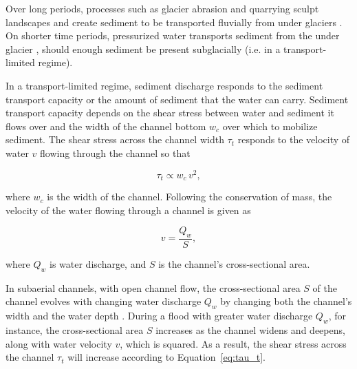 \documentclass[11pt]{article}
\begin{document}
Over long periods, processes such as glacier abrasion and quarrying sculpt landscapes and create sediment to be transported fluvially from under glaciers \citep[c.f.][]{hallet1979,iverson2012,ugelvig2018}. 
On shorter time periods, pressurized water transports sediment from the under glacier \citep{walder1994,creyts2013,beaud2018}, should enough sediment be present subglacially (i.e. in a transport-limited regime).

In a transport-limited regime, sediment discharge responds to the sediment transport capacity or the amount of sediment that the water can carry.
Sediment transport capacity depends on the shear stress between water and sediment it flows  over \citep{shields1936,meyer1948,engelund1967} and the width of the channel bottom $w_c$ over which to mobilize sediment.
The shear stress  across the channel width $\tau_t$ responds to the velocity of water $v$ flowing through the channel so that 
\begin{linenomath*}
  \begin{equation}
    \label{eq:tau_t}
    \tau_t \propto w_c\, v^2,
  \end{equation}
\end{linenomath*}
% 
where $w_c$ is the width of the channel.
Following the conservation of mass, the velocity of the water flowing through a  channel is given as 
\begin{linenomath*}
  \begin{equation}
    \label{eq:v}
    v = \frac{Q_w}{S},
  \end{equation}
\end{linenomath*}
% 
where $Q_w$ is water discharge,  and $S$ is the channel's cross-sectional area.

In subaerial channels, with open channel flow, the cross-sectional area $S$ of the channel evolves with changing water discharge $Q_w$  by changing both the channel's width and the water depth \citep{leopold1953}.
During a flood with greater water discharge $Q_w$, for instance, the cross-sectional area $S$ increases as the channel widens and deepens, along with water velocity $v$, which is squared. As a result, the shear stress across the channel $\tau_t$ will increase according to Equation~\ref{eq:tau_t}. 
\end{document}
